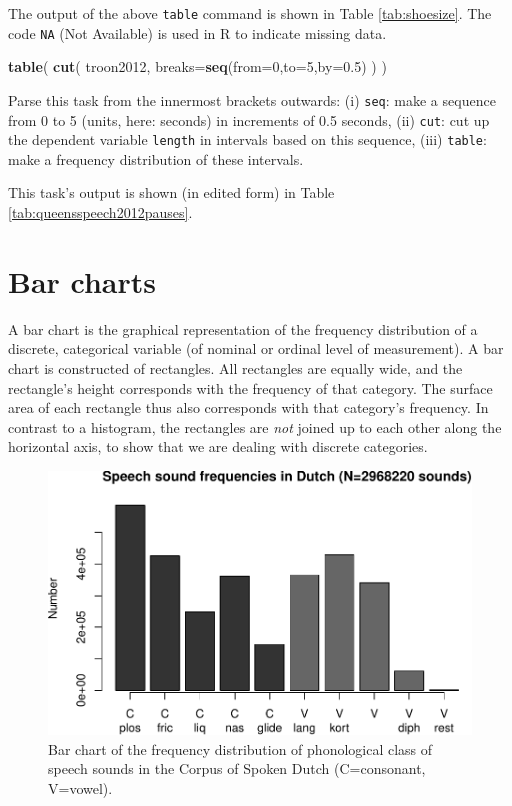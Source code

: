 \documentclass[
]{book}
\newenvironment{Shaded}{\begin{snugshade}}{\end{snugshade}}
\newcommand{\DataTypeTok}[1]{\textcolor[rgb]{0.13,0.29,0.53}{#1}}
\newcommand{\DecValTok}[1]{\textcolor[rgb]{0.00,0.00,0.81}{#1}}
\newcommand{\FloatTok}[1]{\textcolor[rgb]{0.00,0.00,0.81}{#1}}
\newcommand{\KeywordTok}[1]{\textcolor[rgb]{0.13,0.29,0.53}{\textbf{#1}}}
\newcommand{\NormalTok}[1]{#1}
\begin{document}
The output of the above \texttt{table} command is shown in Table \ref{tab:shoesize}.
The code \texttt{NA} (Not Available) is used in R to indicate missing data.

\begin{Shaded}
\begin{Highlighting}[]
\KeywordTok{table}\NormalTok{( }\KeywordTok{cut}\NormalTok{( troon2012, }\DataTypeTok{breaks=}\KeywordTok{seq}\NormalTok{(}\DataTypeTok{from=}\DecValTok{0}\NormalTok{,}\DataTypeTok{to=}\DecValTok{5}\NormalTok{,}\DataTypeTok{by=}\FloatTok{0.5}\NormalTok{) ) )}
\end{Highlighting}
\end{Shaded}

Parse this task from the innermost brackets outwards:
(i) \texttt{seq}: make a sequence from 0 to 5 (units, here: seconds) in increments of 0.5 seconds,
(ii) \texttt{cut}: cut up the dependent variable \texttt{length} in intervals based on this sequence,
(iii) \texttt{table}: make a frequency distribution of these intervals.

This task's output is shown (in edited form) in Table \ref{tab:queensspeech2012pauses}.

\hypertarget{sec:barcharts}{%
\section{Bar charts}\label{sec:barcharts}}

A bar chart is the graphical representation of the
frequency distribution of a discrete, categorical variable (of
nominal or ordinal level of measurement). A bar chart is constructed
of rectangles. All rectangles are equally wide, and the
rectangle's height corresponds with the frequency of that category. The
surface area of each rectangle thus also corresponds with that category's frequency.
In contrast to a histogram, the rectangles are \emph{not}
joined up to each other along the horizontal axis, to
show that we are dealing with discrete categories.

\begin{figure}
\centering
\includegraphics{QMS-EN_files/figure-latex/klankfreq-barplot-1.pdf}
\caption{\label{fig:klankfreq-barplot}Bar chart of the frequency distribution of phonological class of speech sounds in the Corpus of Spoken Dutch (C=consonant, V=vowel).}
\end{figure}
\end{document}
